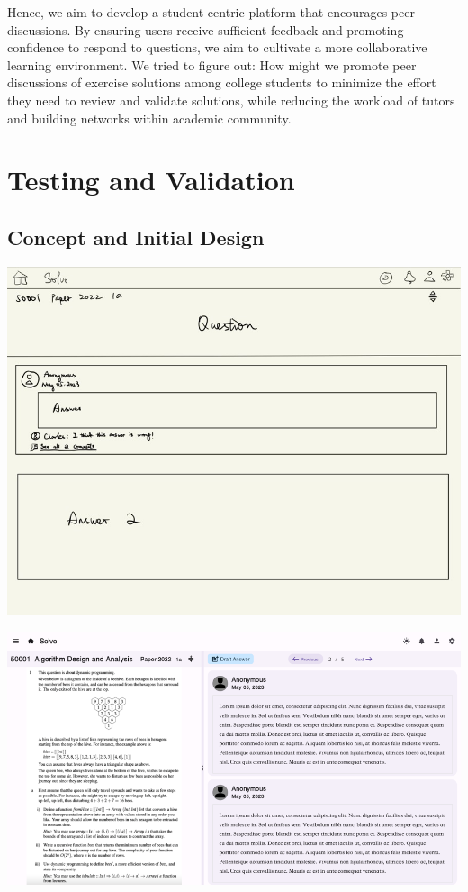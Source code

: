 \documentclass[a4paper]{article}
\begin{document}
    Hence, we aim to develop a student-centric platform that encourages peer discussions.
    By ensuring users receive sufficient feedback and promoting confidence to respond to questions, we aim to cultivate a more collaborative learning environment.
    We tried to figure out: How might we promote peer discussions of exercise solutions among college students to minimize the effort they need to review and validate solutions,
    while reducing the workload of tutors and building networks within academic community.

    \section*{Testing and Validation}

    \subsection*{Concept and Initial Design}
    \noindent \begin{minipage}{0.4\textwidth}
        \centering
        \includegraphics[width=\textwidth]{concept2}
    \end{minipage}\hspace{0.05\textwidth}
    \begin{minipage}{0.57\textwidth}
        \centering
        \includegraphics[width=\textwidth]{question-page2}
    \end{minipage}
\end{document}
